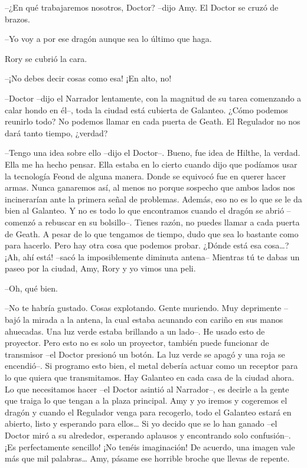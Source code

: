 {--¿En qué trabajaremos nosotros, Doctor? --dijo Amy. El Doctor se
cruzó de brazos.}

{--Yo voy a por ese dragón aunque sea lo último que haga.}

{Rory se cubrió la cara.}

{--¡No debes decir cosas como esa! ¡En alto, no!}

{--Doctor --dijo el Narrador lentamente, con la magnitud de su tarea
	comenzando a calar hondo en él--, toda la ciudad está cubierta de
	Galanteo. ¿Cómo podemos reunirlo todo? No podemos llamar en cada puerta
de Geath. El Regulador no nos dará tanto tiempo, ¿verdad?}

{--Tengo una idea sobre ello --dijo el Doctor--. Bueno, fue idea de
	Hilthe, la verdad. Ella me ha hecho pensar. Ella estaba en lo cierto
	cuando dijo que podíamos usar la tecnología Feond de alguna manera.
	Donde se equivocó fue en querer hacer armas. Nunca ganaremos así, al
	menos no porque sospecho que ambos lados nos incinerarían ante la
	primera señal de problemas. Además, eso no es lo que se le da bien al
	Galanteo. Y no es todo lo que encontramos cuando el dragón se abrió
	--comenzó a rebuscar en su bolsillo--. Tienes razón, no puedes llamar a
	cada puerta de Geath. A pesar de lo que tengamos de tiempo, dudo que sea
	lo bastante como para hacerlo. Pero hay otra cosa que podemos probar.
	¿Dónde está esa cosa\ldots{}? ¡Ah, ahí está! --sacó la imposiblemente
	diminuta antena-- Mientras tú te dabas un paseo por la ciudad, Amy, Rory
y yo vimos una peli.}

{--Oh, qué bien.}

{--No te habría gustado. Cosas explotando. Gente muriendo. Muy
	deprimente --bajó la mirada a la antena, la cual estaba acunando con
	cariño en sus manos ahuecadas. Una luz verde estaba brillando a un
	lado--. He usado esto de proyector. Pero esto no es solo un proyector,
	también puede funcionar de transmisor --el Doctor presionó un botón. La
	luz verde se apagó y una roja se encendió--. Si programo esto bien, el
	metal debería actuar como un receptor para lo que quiera que
	transmitamos. Hay Galanteo en cada casa de la ciudad ahora. Lo que
	necesitamos hacer --el Doctor asintió al Narrador--, es decirle a la
	gente que traiga lo que tengan a la plaza principal. Amy y yo iremos y
	cogeremos el dragón y cuando el Regulador venga para recogerlo, todo el
	Galanteo estará en abierto, listo y esperando para ellos\ldots{} Si yo
	decido que se lo han ganado --el Doctor miró a su alrededor, esperando
	aplausos y encontrando solo confusión--. ¡Es perfectamente sencillo! ¡No
	tenéis imaginación! De acuerdo, una imagen vale más que mil
	palabras\ldots{} Amy, pásame ese horrible broche que llevas de repente.}

